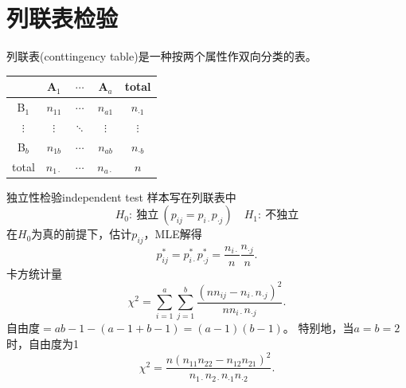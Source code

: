 \section{列联表检验}
列联表(conttingency table)是一种按两个属性作双向分类的表。
\begin{notecaptionblock}
	\begin{tabular}{c|ccc|c}
		\toprule
		&A$_1$&$\cdots$&A$_a$&total\\
		\hline
		B$_1$&$n_{11}$&$\cdots$&$n_{a1}$&$n_{\cdot 1}$\\
		$\vdots$&$\vdots$&$\ddots$&$\vdots$&$\vdots$\\
		B$_b$&$n_{1b}$&$\cdots$&$n_{ab}$&$n_{\cdot b}$\\
		\hline
		total&$n_{1\cdot}$&$\cdots$&$n_{a\cdot}$&$n$\\
		\bottomrule
	\end{tabular}
\end{notecaptionblock}
\begin{example}{独立性检验}{independent test}
	样本写在列联表中
	\[
		H_0:~\text{独立}~(p_{ij} = p_{i\cdot}p_{\cdot j})\quad H_1:~\text{不独立}
	\]
	在$H_0$为真的前提下，估计$p_{ij}$，MLE解得
	\begin{equation}\label{eq:ps-independence-fitted-probability}
		p_{ij}^\ast = p_{i\cdot}^\ast p_{\cdot j}^\ast = \frac{n_{i\cdot}}n\frac{n_{\cdot j}}n.
	\end{equation}
	卡方统计量
	\begin{equation}
		\chi^2 = \sum_{i=1}^a\sum_{j=1}^b\frac{(nn_{ij} - n_{i\cdot}n_{\cdot j})^2}{nn_{i\cdot}n_{\cdot j}}.
	\end{equation}
	自由度$= ab - 1 - (a - 1 + b - 1) = (a - 1)(b - 1)$。
	\tcblower
	特别地，当$a = b = 2$时，自由度为1
	\begin{equation}\label{eq:ps-two-by-two-chi-square}
		\chi^2 = \frac{n(n_{11}n_{22} - n_{12}n_{21})^2}{n_{1\cdot}n_{2\cdot}n_{\cdot 1}n_{\cdot 2}}.
	\end{equation}
\end{example}
